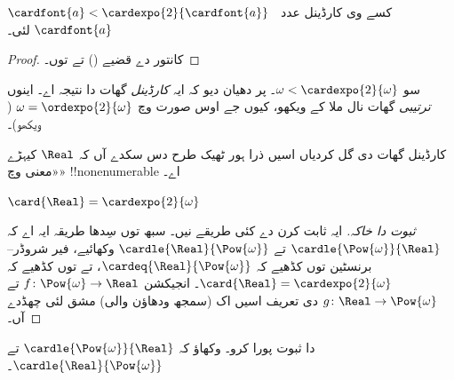 \documentclass[../../../include/open-logic-section]{subfiles}
\begin{document}
\begin{cor}
$\cardfont{a} < \cardexpo{2}{\cardfont{a}}$ کسے وی کارڈینل عدد~$\cardfont{a}$ لئی۔
\end{cor}

\begin{proof}
کانتور دے قضیے () تے  توں۔
\end{proof}
\noindent
سو $\omega < \cardexpo{2}{\omega}$۔ پر دھیان دیو کہ ایہ \emph{کارڈینل} گھات دا نتیجہ اے۔ اینوں \emph{ترتیبی} گھات نال ملا کے ویکھو، کیوں جے اوس صورت وچ $\omega =
\ordexpo{2}{\omega}$ ( ویکھو)۔

کارڈینل گھات دی گل کردیاں اسیں ذرا ہور ٹھیک طرح دس سکدے آں کہ $\Real$ کیہڑے «معنی وچ» !!{nonenumerable} اے۔

\begin{thm}
$\card{\Real} = \cardexpo{2}{\omega}$
\end{thm}

\begin{proof}[ثبوت دا خاکہ]
ایہ ثابت کرن دے کئی طریقے نیں۔ سبھ توں سِدھا طریقہ ایہ اے کہ $\cardle{\Pow{\omega}}{\Real}$ تے $\cardle{\Real}{\Pow{\omega}}$ وکھائیے، فیر شروڈر–برنسٹین توں کڈھیے کہ $\cardeq{\Real}{\Pow{\omega}}$، تے  توں کڈھیے کہ $\card{\Real} = \cardexpo{2}{\omega}$۔ انجیکشن $f \colon
\Pow{\omega} \to \Real$ تے $g \colon \Real \to \Pow{\omega}$ دی تعریف اسیں اک (سمجھ ودھاؤن والی) مشق لئی چھڈدے آں۔
\end{proof}

\begin{prob}
 دا ثبوت پورا کرو۔ وکھاؤ کہ $\cardle{\Pow{\omega}}{\Real}$ تے
$\cardle{\Real}{\Pow{\omega}}$۔
\end{prob}
\end{document}
